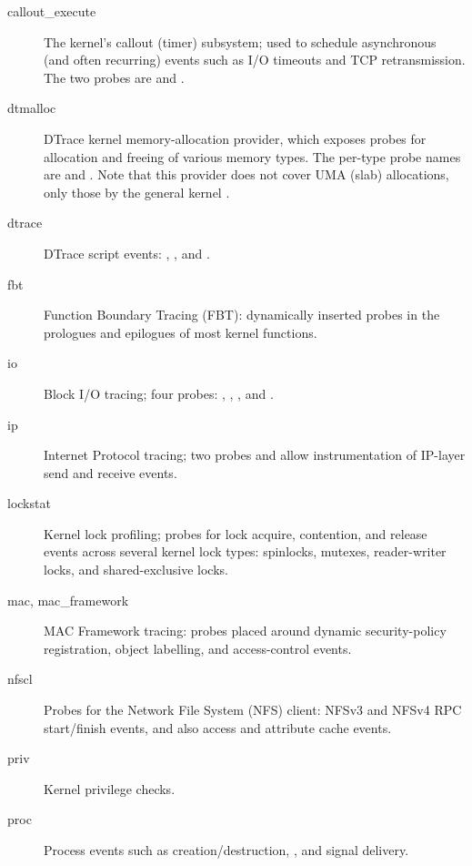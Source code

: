 \documentclass[a4paper,10pt]{article}
\begin{document}
\begin{description}
\item[callout\_execute] The kernel's callout (timer) subsystem; used to
  schedule asynchronous (and often recurring) events such as I/O timeouts and
  TCP retransmission.
  The two probes are  and .

\item[dtmalloc] DTrace kernel memory-allocation provider, which exposes probes
  for allocation and freeing of various memory types.
  The per-type probe names are  and .
  Note that this provider does not cover UMA (slab) allocations, only those by
  the general kernel .

\item[dtrace] DTrace script events: , , and
  .

\item[fbt] Function Boundary Tracing (FBT): dynamically inserted probes in the
  prologues and epilogues of most kernel functions.

\item[io] Block I/O tracing; four probes: , ,
  , and .

\item[ip] Internet Protocol tracing; two probes  and
   allow instrumentation of IP-layer send and receive events.

\item[lockstat] Kernel lock profiling; probes for lock acquire, contention,
  and release events across several kernel lock types: spinlocks, mutexes,
  reader-writer locks, and shared-exclusive locks.

\item[mac, mac\_framework] MAC Framework tracing: probes placed around dynamic
  security-policy registration, object labelling, and access-control events.

\item[nfscl] Probes for the Network File System (NFS) client: NFSv3 and NFSv4
  RPC start/finish events, and also access and attribute cache events.

\item[priv] Kernel privilege checks.

\item[proc] Process events such as creation/destruction, , and
  signal delivery.


\end{description}
\end{document}

